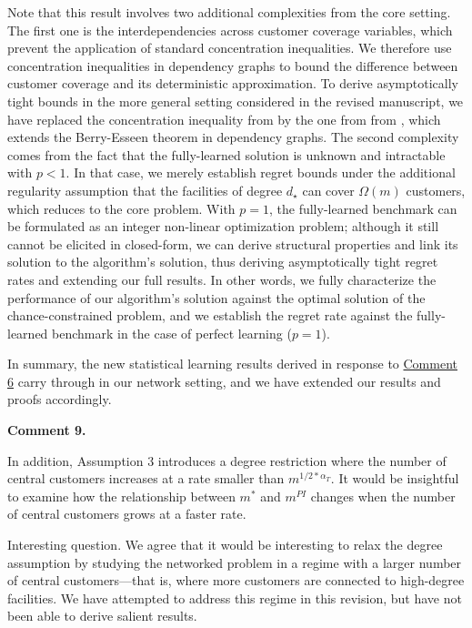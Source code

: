 \documentclass[11pt]{article}
\begin{document}
Note that this result involves two additional complexities from the core setting. The first one is the interdependencies across customer coverage variables, which prevent the application of standard concentration inequalities. We therefore use concentration inequalities in dependency graphs to bound the difference between customer coverage and its deterministic approximation. To derive asymptotically tight bounds in the more general setting considered in the revised manuscript, we have replaced the concentration inequality from \cite{janson2004large} by the one from from \cite{janisch2024berry}, which extends the Berry-Esseen theorem in dependency graphs. The second complexity comes from the fact that the fully-learned solution is unknown and intractable with $p<1$. In that case, we merely establish regret bounds under the additional regularity assumption that the facilities of degree $d_\star$ can cover $\Omega(m)$ customers, which reduces to the core problem. With $p=1$, the fully-learned benchmark can be formulated as an integer non-linear optimization problem; although it still cannot be elicited in closed-form, we can derive structural properties and link its solution to the algorithm's solution, thus deriving asymptotically tight regret rates and extending our full results. In other words, we fully characterize the performance of our algorithm's solution against the optimal solution of the chance-constrained problem, and we establish the regret rate against the fully-learned benchmark in the case of perfect learning ($p=1$).

In summary, the new statistical learning results derived in response to \hyperref[R2:6]{\color{blue}Comment 6} carry through in our network setting, and we have extended our results and proofs accordingly.

\begin{commentBox}
    \textbf{Comment 9.}\label{R2:9}

    In addition, Assumption 3 introduces a degree restriction where the number of central customers increases at a rate smaller than $m^{1/2*\alpha_T}$. It would be insightful to examine how the relationship between $m^*$ and $m^{PI}$ changes when the number of central customers grows at a faster rate.
\end{commentBox}

Interesting question. We agree that it would be interesting to relax the degree assumption by studying the networked problem in a regime with a larger number of central customers---that is, where more customers are connected to high-degree facilities. We have attempted to address this regime in this revision, but have not been able to derive salient results.
\end{document}
